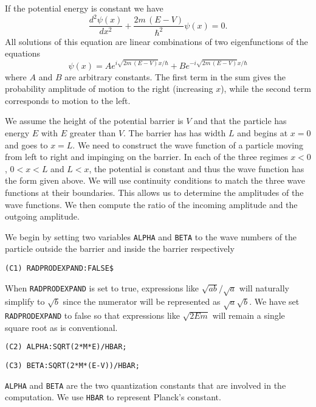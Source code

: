 If the potential energy is constant we have
\[
\frac{d^2 \psi(x)}{dx^2} + \frac{2 m\,(E - V)}{\hbar^2} \psi(x) = 0.
\]
All solutions of this equation are linear combinations of two eigenfunctions
of the equations
\[
\psi(x) =  A e^{i \sqrt{2m\,(E - V)} x/ \hbar} + B e^{- i \sqrt{2m\,(E
- V)} x/ \hbar} 
\]
where $A$ and $B$ are arbitrary constants.  The first term in the sum gives
the probability amplitude of motion to the right (increasing $x$), while the
second term corresponds to motion to the left.  

We assume the height of the potential barrier is $V$ and that the
particle has energy $E$ with $E$ greater than $V$.
The barrier has has width $L$ and begins at $x=0$ and goes to
$x=L$.  We need to construct the wave function of a particle moving from
left to right and impinging on the barrier.  In each of the three regimes
$x<0$, $0<x<L$ and $L<x$, the potential is constant and thus the wave
function has the form given above.  We will use continuity conditions to
match the three wave functions at their boundaries.  This allows us to
determine the amplitudes of the wave functions.  We then compute the ratio
of the incoming amplitude and the outgoing amplitude.

We begin by setting two variables {\tt ALPHA} and {\tt BETA} to the wave
numbers of the particle outside the barrier and inside the barrier respectively
\begin{verbatim}
(C1) RADPRODEXPAND:FALSE$
\end{verbatim}
When {\tt RADPRODEXPAND} is set to true, expressions like $\sqrt{a b} /
\sqrt{a}$ will naturally simplify to $\sqrt{b}$ since the numerator will be
represented as $\sqrt{a} \sqrt{b}$.  We have set {\tt RADPRODEXPAND} to
false so that expressions like $\sqrt{2Em}$ will remain a single square
root as is conventional.
\begin{verbatim}
(C2) ALPHA:SQRT(2*M*E)/HBAR;
\end{verbatim}
\begin{verbatim}
(C3) BETA:SQRT(2*M*(E-V))/HBAR;
\end{verbatim}
{\tt ALPHA} and {\tt BETA} are the two quantization constants that are
involved in the computation.  We use {\tt HBAR} to represent Planck's
constant.


